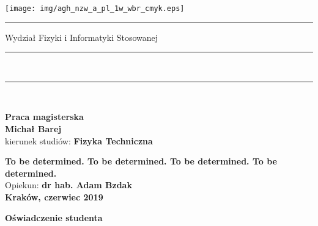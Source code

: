 \documentclass[a4paper,12pt]{article}
\begin{document}

\thispagestyle{empty}
\texttt{[image: img/agh\_nzw\_a\_pl\_1w\_wbr\_cmyk.eps]}\\
\rule{30mm}{0pt}
{\large \textsf{Wydział Fizyki i Informatyki Stosowanej}}\\
\rule{\textwidth}{3pt}\\
\rule[2ex]
{\textwidth}{1pt}\\
\vspace{7ex}
\begin{center}
{\LARGE \bf \textsf{Praca magisterska}}\\
\vspace{13ex}
{\bf \Large \textsf{Michał Barej}}\\
\vspace{3ex}
{\sf\small kierunek studiów:} {\bf\small \textsf{Fizyka Techniczna}}\\
\vspace{1.5ex}

{\bf \huge \textsf{To be determined. To be determined. To be determined. To be determined.}}\\
\vspace{14ex}
{\Large Opiekun: \bf \textsf{dr hab. Adam Bzdak}}\\
\vspace{22ex}
{\large \bf \textsf{Kraków, czerwiec 2019}}
\end{center}

\newpage

\begin{center}
        {\bf\large\textsf{Oświadczenie studenta}}
\end{center}
\end{document}
